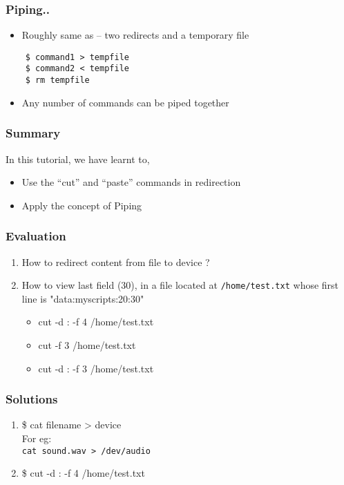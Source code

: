 \documentclass[17pt,compress]{beamer}
\begin{document}
\begin{frame}[fragile]
  \frametitle{Piping..}
  \begin{itemize}
  \item Roughly same as -- two redirects and a temporary file
  \end{itemize}
  \begin{lstlisting}
    $ command1 > tempfile
    $ command2 < tempfile
    $ rm tempfile
\end{lstlisting} %
\begin{itemize}
\item Any number of commands can be piped together
\end{itemize}
\end{frame}


\begin{frame}
\frametitle{Summary}
\label{sec-8}

  In this tutorial, we have learnt to,


\begin{itemize}
\item Use the ``cut'' and ``paste'' commands in redirection
\item Apply the concept of Piping
\end{itemize}
\end{frame}
\begin{frame}[fragile]
\frametitle{Evaluation}
\label{sec-9}


\begin{enumerate}
\item How to redirect content from file to device ?
\vspace{12pt}
\item How to view last field (30), in a file located at \verb~/home/test.txt~ 
whose first line is "data:myscripts:20:30"
\vspace{5pt}
\begin{itemize}
\item cut -d : -f 4 /home/test.txt
\item cut -f 3 /home/test.txt
\item cut -d : -f 3 /home/test.txt
\end{itemize}
\end{enumerate}
\end{frame}
\begin{frame}
\frametitle{Solutions}
\label{sec-10}


\begin{enumerate}
\item \$ cat filename > device\\
For eg:\\
\hspace{8pt} \verb~cat sound.wav > /dev/audio~    
\vspace{22pt}
\item \$ cut -d : -f 4 /home/test.txt
\end{enumerate}
\end{frame}
\end{document}

